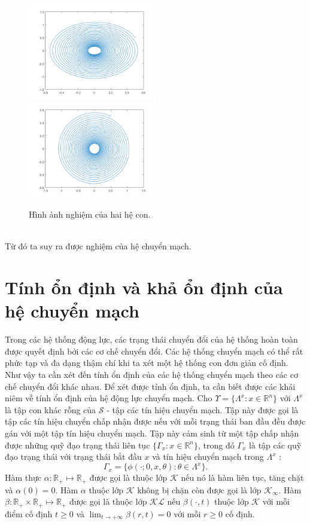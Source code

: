 \documentclass[14pt,a4paper,oneside]{report}		%
\theoremstyle{definition}
\begin{document}
\begin{figure}[h]
\includegraphics[width=0.5\textwidth]{graph1.png}
\hspace{\fill}
\includegraphics[width=0.5\textwidth]{graph2.png}
\caption{Hình ảnh nghiệm của hai hệ con.}\label{fig:xyz}
\end{figure}\\
Từ đó ta suy ra được nghiệm của hệ chuyển mạch.

\section{Tính ổn định và khả ổn định của hệ chuyển mạch}
Trong các hệ thống động lực, các trạng thái chuyển đổi của hệ thống hoàn toàn được quyết định bởi các cơ chế chuyển đổi. Các hệ thống chuyển mạch có thể rất phức tạp và đa dạng thậm chí khi ta xét một hệ thống con đơn giản cố định. Như vậy ta cần xét đến tính ổn định của các hệ thống chuyển mạch theo các cơ chế chuyển đổi khác nhau. Để xét được tính ổn định, ta cần biết được các khái niêm về tính ổn định của hệ động lực chuyển mạch.
Cho $\Upsilon = \{\Lambda^x:x\in\mathbb{R}^n\}$ với $\Lambda^x$ là tập con khác rỗng của $\mathcal{S}$ - tập các tín hiệu chuyển mạch. Tập này được gọi là tập các tín hiệu chuyển chấp nhận được nếu với mỗi trạng thái ban đầu đều được gán với một tập tín hiệu chuyển mạch. Tập này cảm sinh từ một tập chấp nhận được những quỹ đạo trạng thái liên tục $\{\Gamma_x:x\in\mathbb{R}^n\}$, trong đó $\Gamma_x$ là tập các quỹ đạo trạng thái với trạng thái bắt đầu $x$ và tín hiệu chuyển mạch trong $\Lambda^x$ :
$$\Gamma_x = \{\phi(\cdot;0,x,\theta):\theta\in\Lambda^x\}.$$
Hàm thực $\alpha :\mathbb{R}_+ \mapsto \mathbb{R}_+$ được gọi là thuộc lớp $\mathcal{K}$ nếu nó là hàm liên tục, tăng chặt và $\alpha(0)=0$. Hàm $\alpha$ thuộc lớp $\mathcal{K}$ không bị chặn còn được gọi là lớp $\mathcal{K}_\infty$. Hàm $\beta : \mathbb{R}_+ \times \mathbb{R}_+ \mapsto \mathbb{R}_+$ được gọi là thuộc lớp $\mathcal{KL}$ nếu $\beta(\cdot,t)$ thuộc lớp $\mathcal{K}$ với mỗi điểm cố định $t \geq 0$ và $\lim_{t\rightarrow +\infty}\beta(r,t)=0$ với mỗi $r\geq 0$ cố định.
\end{document}
